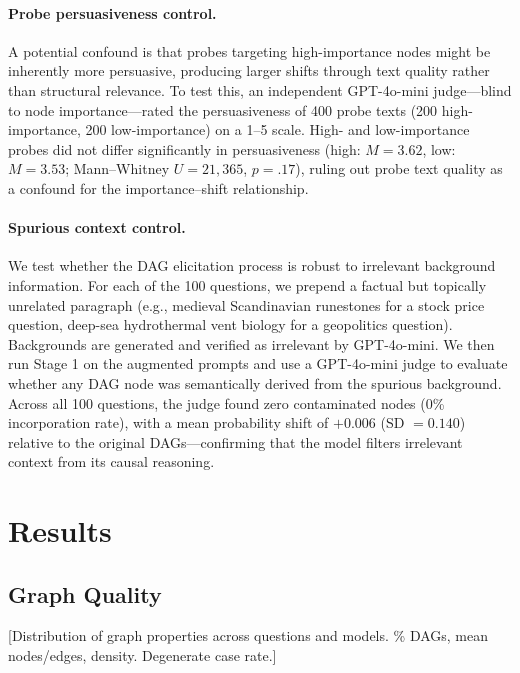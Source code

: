 \documentclass[11pt]{article}
\begin{document}
\paragraph{Probe persuasiveness control.} A potential confound is that probes targeting high-importance nodes might be inherently more persuasive, producing larger shifts through text quality rather than structural relevance. To test this, an independent GPT-4o-mini judge---blind to node importance---rated the persuasiveness of 400 probe texts (200 high-importance, 200 low-importance) on a 1--5 scale. High- and low-importance probes did not differ significantly in persuasiveness (high: $M = 3.62$, low: $M = 3.53$; Mann--Whitney $U = 21{,}365$, $p = .17$), ruling out probe text quality as a confound for the importance--shift relationship.

\paragraph{Spurious context control.} We test whether the DAG elicitation process is robust to irrelevant background information. For each of the 100 questions, we prepend a factual but topically unrelated paragraph (e.g., medieval Scandinavian runestones for a stock price question, deep-sea hydrothermal vent biology for a geopolitics question). Backgrounds are generated and verified as irrelevant by GPT-4o-mini. We then run Stage 1 on the augmented prompts and use a GPT-4o-mini judge to evaluate whether any DAG node was semantically derived from the spurious background. Across all 100 questions, the judge found zero contaminated nodes (0\% incorporation rate), with a mean probability shift of $+0.006$ (SD $= 0.140$) relative to the original DAGs---confirming that the model filters irrelevant context from its causal reasoning.

\section{Results}
\label{sec:results}


\subsection{Graph Quality}

[Distribution of graph properties across questions and models. \% DAGs, mean nodes/edges, density. Degenerate case rate.]
\end{document}

